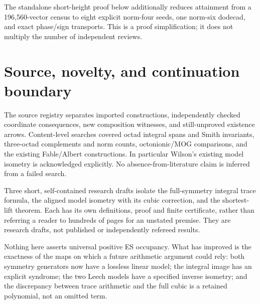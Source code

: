 The standalone short-height proof below additionally reduces attainment from a 196,560-vector census to eight explicit norm-four seeds, one norm-six dodecad, and exact phase/sign transports. This is a proof simplification; it does not multiply the number of independent reviews.

\section{Source, novelty, and continuation boundary}
The source registry separates imported constructions, independently checked coordinate consequences, new composition witnesses, and still-unproved existence arrows. Content-level searches covered octad integral spans and Smith invariants, three-octad complements and norm counts, octonionic/MOG comparisons, and the existing Fable/Albert constructions. In particular Wilson's existing model isometry is acknowledged explicitly. No absence-from-literature claim is inferred from a failed search.

Three short, self-contained research drafts isolate the full-symmetry integral trace formula, the aligned model isometry with its cubic correction, and the shortest-lift theorem. Each has its own definitions, proof and finite certificate, rather than referring a reader to hundreds of pages for an unstated premise. They are research drafts, not published or independently refereed results.

Nothing here asserts universal positive ES occupancy. What has improved is the exactness of the maps on which a future arithmetic argument could rely: both symmetry generators now have a lossless linear model; the integral image has an explicit syndrome; the two Leech models have a specified inverse isometry; and the discrepancy between trace arithmetic and the full cubic is a retained polynomial, not an omitted term.
